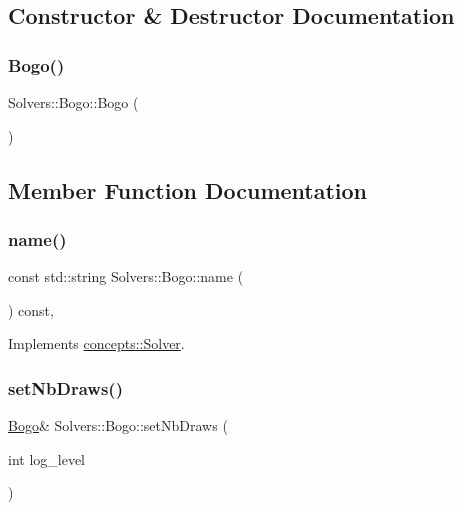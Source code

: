 \subsection{Constructor \& Destructor Documentation}
\mbox{\label{class_solvers_1_1_bogo_a2aa7f7e6b327254f789449a768dbf384}} 
\subsubsection{\texorpdfstring{Bogo()}{Bogo()}}
{\footnotesize\ttfamily Solvers\+::\+Bogo\+::\+Bogo (\begin{DoxyParamCaption}{ }\end{DoxyParamCaption})\hspace{0.3cm}{\ttfamily [inline]}}



\subsection{Member Function Documentation}
\mbox{\label{class_solvers_1_1_bogo_a496539bab5a74757fe6d50e78e0a641f}} 
\subsubsection{\texorpdfstring{name()}{name()}}
{\footnotesize\ttfamily const std\+::string Solvers\+::\+Bogo\+::name (\begin{DoxyParamCaption}{ }\end{DoxyParamCaption}) const\hspace{0.3cm}{\ttfamily [inline]}, {\ttfamily [virtual]}}



Implements \hyperlink{classconcepts_1_1_solver_ab995568318a506446228f45cab2fcce7}{concepts\+::\+Solver}.

\mbox{\label{class_solvers_1_1_bogo_a71508927ade20d8478509c1ec0ed7119}} 
\subsubsection{\texorpdfstring{set\+Nb\+Draws()}{setNbDraws()}}
{\footnotesize\ttfamily \hyperlink{class_solvers_1_1_bogo}{Bogo}\& Solvers\+::\+Bogo\+::set\+Nb\+Draws (\begin{DoxyParamCaption}\item[{int}]{log\+\_\+level }\end{DoxyParamCaption})\hspace{0.3cm}{\ttfamily [inline]}}

